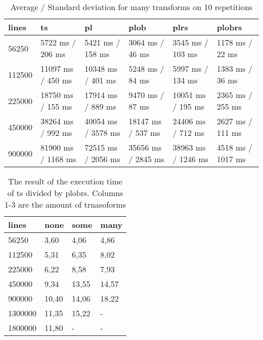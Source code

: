 \begin{table}[ht]
	\caption{Average / Standard deviation for many transforms on 10 repetitions}
	\label{tab:eval:many}
	\begin{tabular}{|l|l|l|l|l|l|}
		\hline
		lines  & ts                 & pl                 & plob               & plrs               & plobrs            \\
		\hline
		56250  & 5722 ms / 206 ms   & 5421 ms / 158 ms   & 3064 ms / 46 ms    & 3545 ms / 103 ms   & 1178 ms / 22 ms   \\
		112500 & 11097 ms / 450 ms  & 10348 ms / 401 ms  & 5248 ms / 84 ms    & 5997 ms / 134 ms   & 1383 ms / 36 ms   \\
		225000 & 18750 ms / 155 ms  & 17914 ms / 889 ms  & 9470 ms / 87 ms    & 10051 ms / 195 ms  & 2365 ms / 255 ms  \\
		450000 & 38264 ms / 992 ms  & 40054 ms / 3578 ms & 18147 ms / 537 ms  & 24406 ms / 712 ms  & 2627 ms / 111 ms  \\
		900000 & 81900 ms / 1168 ms & 72515 ms / 2056 ms & 35656 ms / 2845 ms & 38963 ms / 1246 ms & 4518 ms / 1017 ms \\
		\hline
	\end{tabular}
\end{table}

\begin{table}[ht]
	\caption{The result of the execution time of ts divided by plobrs. Columns 1-3 are the amount of trnasoforms}
	\label{tab:eval:ts_div_by_plobrs}
	\begin{tabular}{|l|l|l|l|}
		\hline
		lines   & none  & some  & many  \\
		\hline
		56250   & 3,60  & 4,06  & 4,86  \\
		112500  & 5,31  & 6,35  & 8,02  \\
		225000  & 6,22  & 8,58  & 7,93  \\
		450000  & 9,34  & 13,55 & 14,57 \\
		900000  & 10,40 & 14,06 & 18,22 \\
		1300000 & 11,35 & 15,22 & -     \\
		1800000 & 11,80 & -     & -     \\
		\hline
	\end{tabular}
\end{table}







\pagebreak
